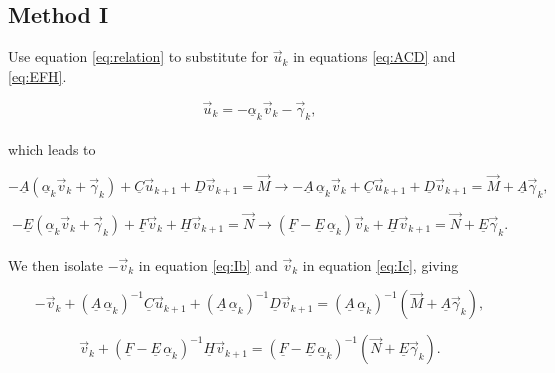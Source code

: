 \documentclass[11pt]{amsart}
\begin{document}
\subsection{Method I}

Use equation \ref{eq:relation} to substitute for $\vec{u}_{k}$ in equations \ref{eq:ACD} and \ref{eq:EFH}.

\begin{equation} \label{eq:Ia}
\vec{u}_{k}  = - \underline{\alpha}_{k}  \vec{v}_{k}  - \vec{\gamma}_{k},
\end{equation}
\\
which leads to

\begin{equation} \label{eq:Ib}
- \underline{A} \left(  \underline{\alpha}_{k}  \vec{v}_{k}  + \vec{\gamma}_{k} \right) + \underline{C} \vec{u}_{k+1} + \underline{D} \vec{v}_{k+1} = \vec{M}      \longrightarrow       - \underline{A} \, \underline{\alpha}_{k}  \vec{v}_{k}  + \underline{C} \vec{u}_{k+1} + \underline{D} \vec{v}_{k+1} = \vec{M}  + \underline{A} \vec{\gamma}_{k},
\end{equation} 

\begin{equation} \label{eq:Ic}
- \underline{E} \left(  \underline{\alpha}_{k}  \vec{v}_{k}  + \vec{\gamma}_{k} \right) + \underline{F} \vec{v}_{k} + \underline{H} \vec{v}_{k+1} = \vec{N}   \longrightarrow   \left( \underline{F} - \underline{E} \, \underline{\alpha}_{k} \right) \vec{v}_{k} + \underline{H} \vec{v}_{k+1} = \vec{N} + \underline{E} \vec{\gamma}_{k} .
\end{equation} 
\\
We then isolate $-\vec{v}_{k}$ in equation \ref{eq:Ib} and $\vec{v}_{k}$ in equation \ref{eq:Ic}, giving

\begin{equation} \label{eq:Id}
-  \vec{v}_{k}  + \left( \underline{A} \, \underline{\alpha}_{k} \right)^{-1}  \underline{C} \vec{u}_{k+1} + \left( \underline{A} \, \underline{\alpha}_{k} \right)^{-1}  \underline{D} \vec{v}_{k+1} = \left( \underline{A} \, \underline{\alpha}_{k} \right)^{-1} \left( \vec{M}  + \underline{A} \vec{\gamma}_{k} \right) ,
\end{equation} 

\begin{equation} \label{eq:Ie}
 \vec{v}_{k} + \left( \underline{F} - \underline{E} \, \underline{\alpha}_{k} \right)^{-1} \underline{H} \vec{v}_{k+1} =  \left( \underline{F} - \underline{E} \, \underline{\alpha}_{k} \right)^{-1} \left(  \vec{N} + \underline{E} \vec{\gamma}_{k} \right) .
\end{equation} 
\\
\end{document}
